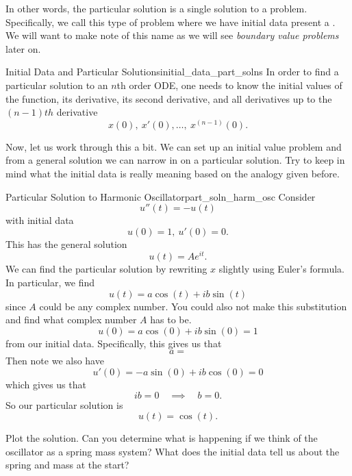        \noindent In other words, the particular solution is a single solution to a problem.  Specifically, we call this type of problem where we have initial data present a  .  We will want to make note of this name as we will see \emph{boundary value problems} later on.

        \begin{prop}{Initial Data and Particular Solutions}{initial_data_part_solns}
        In order to find a particular solution to an $n$th order ODE, one needs to know the initial values of the function, its derivative, its second derivative, and all derivatives up to the $(n-1)th$ derivative
        \[
        x(0),~ x'(0),\dots,~ x^{(n-1)}(0).
        \]
        \end{prop}

        \noindent Now, let us work through this a bit.  We can set up an initial value problem and from a general solution we can narrow in on a particular solution.  Try to keep in mind what the initial data is really meaning based on the analogy given before.


        \begin{ex}{Particular Solution to Harmonic Oscillator}{part_soln_harm_osc}
        Consider
        \[
        u''(t)=-u(t)
        \]
        with initial data
        \[
        u(0)=1, ~ u'(0)=0.
        \]
        This has the general solution
        \[
        u(t)=Ae^{it}.
        \]
        We can find the particular solution by rewriting $x$ slightly using Euler's formula. In particular, we find
        \[
        u(t)=a\cos(t)+ib\sin(t)
        \]
        since $A$ could be any complex number.  You could also not make this substitution and find what complex number $A$ has to be.
        \[
        u(0)=a\cos(0)+ib\sin(0)=1
        \]
        from our initial data.  Specifically, this gives us that
        \[
        a=
        \]
        Then note we also have
        \[
        u'(0)=-a\sin (0) +i b\cos (0)=0
        \]
        which gives us that
        \[
        ib=0 \quad \implies \quad b=0.
        \]
        So our particular solution is
        \[
        u(t)=\cos (t).
        \]
        \end{ex}

        \begin{exercise}
        Plot the solution. Can you determine what is happening if we think of the oscillator as a spring mass system? What does the initial data tell us about the spring and mass at the start?
        \end{exercise}

